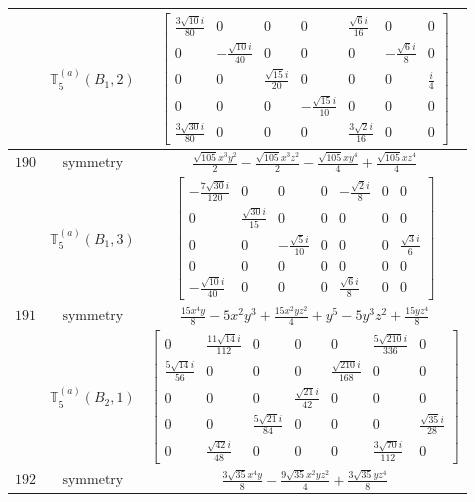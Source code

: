 \documentclass[fleqn,8pt,landscape]{jsarticle}
\begin{document}
\begin{longtable}{ccc}
$  $ & $ \mathbb{T}_{5}^{(a)}(B_{1},2) $ & $ \begin{bmatrix} \frac{3 \sqrt{10} i}{80} & 0 & 0 & 0 & \frac{\sqrt{6} i}{16} & 0 & 0 \\ 0 & - \frac{\sqrt{10} i}{40} & 0 & 0 & 0 & - \frac{\sqrt{6} i}{8} & 0 \\ 0 & 0 & \frac{\sqrt{15} i}{20} & 0 & 0 & 0 & \frac{i}{4} \\ 0 & 0 & 0 & - \frac{\sqrt{15} i}{10} & 0 & 0 & 0 \\ \frac{3 \sqrt{30} i}{80} & 0 & 0 & 0 & \frac{3 \sqrt{2} i}{16} & 0 & 0 \end{bmatrix} $ \\ \hline
$ 190 $ & $ \text{symmetry} $ & $ \frac{\sqrt{105} x^{3} y^{2}}{2} - \frac{\sqrt{105} x^{3} z^{2}}{2} - \frac{\sqrt{105} x y^{4}}{4} + \frac{\sqrt{105} x z^{4}}{4} $ \\
$  $ & $ \mathbb{T}_{5}^{(a)}(B_{1},3) $ & $ \begin{bmatrix} - \frac{7 \sqrt{30} i}{120} & 0 & 0 & 0 & - \frac{\sqrt{2} i}{8} & 0 & 0 \\ 0 & \frac{\sqrt{30} i}{15} & 0 & 0 & 0 & 0 & 0 \\ 0 & 0 & - \frac{\sqrt{5} i}{10} & 0 & 0 & 0 & \frac{\sqrt{3} i}{6} \\ 0 & 0 & 0 & 0 & 0 & 0 & 0 \\ - \frac{\sqrt{10} i}{40} & 0 & 0 & 0 & \frac{\sqrt{6} i}{8} & 0 & 0 \end{bmatrix} $ \\ \hline
$ 191 $ & $ \text{symmetry} $ & $ \frac{15 x^{4} y}{8} - 5 x^{2} y^{3} + \frac{15 x^{2} y z^{2}}{4} + y^{5} - 5 y^{3} z^{2} + \frac{15 y z^{4}}{8} $ \\
$  $ & $ \mathbb{T}_{5}^{(a)}(B_{2},1) $ & $ \begin{bmatrix} 0 & \frac{11 \sqrt{14} i}{112} & 0 & 0 & 0 & \frac{5 \sqrt{210} i}{336} & 0 \\ \frac{5 \sqrt{14} i}{56} & 0 & 0 & 0 & \frac{\sqrt{210} i}{168} & 0 & 0 \\ 0 & 0 & 0 & \frac{\sqrt{21} i}{42} & 0 & 0 & 0 \\ 0 & 0 & \frac{5 \sqrt{21} i}{84} & 0 & 0 & 0 & \frac{\sqrt{35} i}{28} \\ 0 & \frac{\sqrt{42} i}{48} & 0 & 0 & 0 & \frac{3 \sqrt{70} i}{112} & 0 \end{bmatrix} $ \\ \hline
$ 192 $ & $ \text{symmetry} $ & $ \frac{3 \sqrt{35} x^{4} y}{8} - \frac{9 \sqrt{35} x^{2} y z^{2}}{4} + \frac{3 \sqrt{35} y z^{4}}{8} $ \\

\end{longtable}
\end{document}
